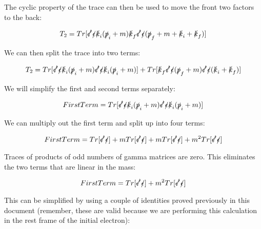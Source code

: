 \documentclass[a4]{article}
\begin{document}
    The cyclic property of the trace can then be used to move the front two factors to the back:

    \begin{equation}
        T_2 = Tr [ \slashed{\epsilon'} \slashed{\epsilon} \slashed{k}_i (\slashed{p}_i + m) \slashed{k}_f \slashed{\epsilon'} \slashed{\epsilon} (\slashed{p}_f + m + \slashed{k}_i + \slashed{k}_f) ]
    \end{equation}

    We can then split the trace into two terms:

    \begin{equation}
        T_2 = Tr [ \slashed{\epsilon'} \slashed{\epsilon} \slashed{k}_i (\slashed{p}_i + m) \slashed{\epsilon'} \slashed{\epsilon} \slashed{k}_i (\slashed{p}_i + m)] + Tr [ \slashed{k}_f \slashed{\epsilon'} \slashed{\epsilon} (\slashed{p}_f + m ) \slashed{\epsilon'} \slashed{\epsilon} ( \slashed{k}_i + \slashed{k}_f) ]
    \end{equation}

    We will simplify the first and second terms separately:

    \begin{equation}
        First Term = Tr [ \slashed{\epsilon'} \slashed{\epsilon} \slashed{k}_i (\slashed{p}_i + m) \slashed{\epsilon'} \slashed{\epsilon} \slashed{k}_i (\slashed{p}_i + m)]
    \end{equation}

    We can multiply out the first term and split up into four terms:

    \begin{equation}
        First Term = Tr [\slashed{\epsilon'} \slashed{\epsilon}] + m Tr[\slashed{\epsilon'} \slashed{\epsilon}] + m Tr [\slashed{\epsilon'} \slashed{\epsilon}] + m^2 Tr [\slashed{\epsilon'} \slashed{\epsilon}]
    \end{equation}

    Traces of products of odd numbers of gamma matrices are zero. This eliminates the two terms that are linear in the mass:

    \begin{equation}
        First Term = Tr [\slashed{\epsilon'} \slashed{\epsilon}] + m^2 Tr [\slashed{\epsilon'} \slashed{\epsilon}]
    \end{equation}

    This can be simplified by using a couple of identities proved previously in this document (remember, these are valid 
    because we are performing this calculation in the rest frame of the initial electron):
\end{document}
